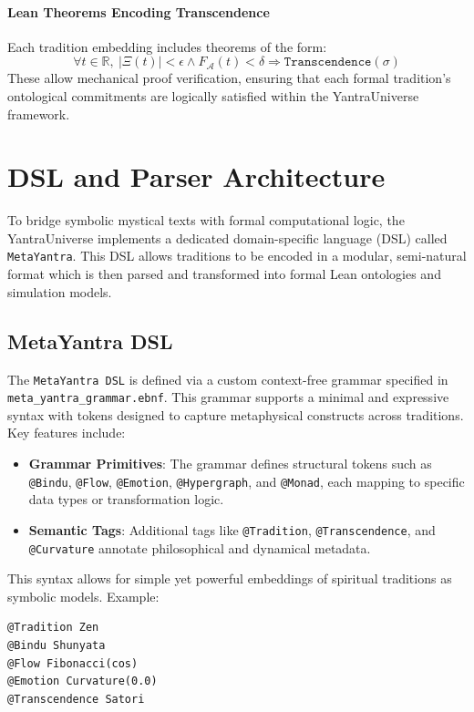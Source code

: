 \documentclass[12pt]{article}
\theoremstyle{plain}
\begin{document}
\paragraph{Lean Theorems Encoding Transcendence}
Each tradition embedding includes theorems of the form:
\[
\forall t \in \mathbb{R},\ |\Xi(t)| < \epsilon \land F_{\mathcal{A}}(t) < \delta \Rightarrow \texttt{Transcendence}(\sigma)
\]
These allow mechanical proof verification, ensuring that each formal tradition's ontological commitments are logically satisfied within the YantraUniverse framework.

\section{DSL and Parser Architecture}

To bridge symbolic mystical texts with formal computational logic, the YantraUniverse implements a dedicated domain-specific language (DSL) called \texttt{MetaYantra}. This DSL allows traditions to be encoded in a modular, semi-natural format which is then parsed and transformed into formal Lean ontologies and simulation models.

\subsection{MetaYantra DSL}

The \texttt{MetaYantra DSL} is defined via a custom context-free grammar specified in \texttt{meta\_yantra\_grammar.ebnf}. This grammar supports a minimal and expressive syntax with tokens designed to capture metaphysical constructs across traditions. Key features include:

\begin{itemize}
  \item \textbf{Grammar Primitives}: The grammar defines structural tokens such as \texttt{@Bindu}, \texttt{@Flow}, \texttt{@Emotion}, \texttt{@Hypergraph}, and \texttt{@Monad}, each mapping to specific data types or transformation logic.
  \item \textbf{Semantic Tags}: Additional tags like \texttt{@Tradition}, \texttt{@Transcendence}, and \texttt{@Curvature} annotate philosophical and dynamical metadata.
\end{itemize}

This syntax allows for simple yet powerful embeddings of spiritual traditions as symbolic models. Example:

\begin{verbatim}
@Tradition Zen
@Bindu Shunyata
@Flow Fibonacci(cos)
@Emotion Curvature(0.0)
@Transcendence Satori
\end{verbatim}
\end{document}
